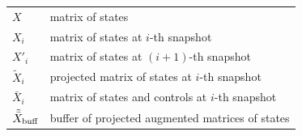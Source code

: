 \begin{table}[ht]
\begin{tabular}{p{2cm}l}
	\(X\)                          & matrix of states                                        \\
	\(X_i\)                        & matrix of states at \(i\)-th snapshot                   \\
	\(X'_i\)                       & matrix of states at \((i+1)\)-th snapshot               \\
	\(\tilde{X}_i\)                & projected matrix of states at \(i\)-th snapshot         \\
	\(\bar{X}_i\)                  & matrix of states and controls at \(i\)-th snapshot      \\
	\(\tilde{\bar{X}} _{\text{buff}}\) & buffer of projected augmented matrices of states        \\
	\bottomrule
	\end{tabular}
\end{table}
